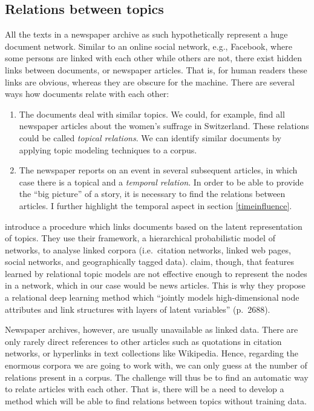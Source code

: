 \subsection{Relations between topics}
All the texts in a newspaper archive as such hypothetically represent a huge document network. Similar to an online social network, e.g., Facebook, where some persons are linked with each other while others are not, there exist hidden links between documents, or newspaper articles. That is, for human readers these links are obvious, whereas they are obscure for the machine. There are several ways how documents relate with each other:
\begin{enumerate}
	\item The documents deal with similar topics. We could, for example, find all newspaper articles about the women's suffrage in Switzerland. These relations could be called \textit{topical relations}. We can identify similar documents by applying topic modeling techniques to a corpus. 
	\item The newspaper reports on an event in several subsequent articles, in which case there is a topical and a \textit{temporal relation}. In order to be able to provide the ``big picture'' of a story, it is necessary to find the relations between articles. I further highlight the temporal aspect in  section \ref{timeinfluence}.
\end{enumerate}

\citet{changhierarchical2010} introduce a procedure which links documents based on the latent representation of topics. They use their framework, a hierarchical probabilistic model of networks, to analyse linked corpora (i.e.~citation networks, linked web pages, social networks, and geographically tagged data). \citet{wangrelational2017} claim, though, that features learned by relational topic models are not effective enough to represent the nodes in a network, which in our case would be news articles. This is why they propose a relational deep learning method which ``jointly models high-dimensional node attributes and link structures with layers of latent variables'' (p.~2688).

Newspaper archives, however, are usually unavailable as linked data. There are only rarely direct references to other articles such as quotations in citation networks, or hyperlinks in text collections like Wikipedia. Hence,  regarding the enormous corpora we are going to work with, we can only guess at the number of relations present in a corpus. The challenge will thus be to find an automatic way to relate articles with each other. That is, there will be a need to develop a method which will be able to find relations between topics without training data.


